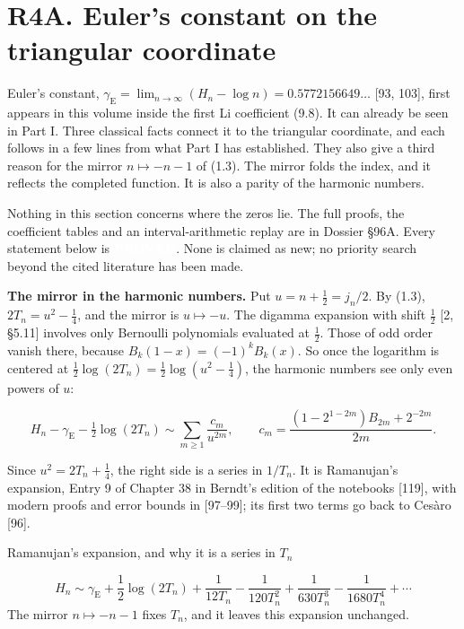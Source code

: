 \documentclass[
  11pt,
]{book}
\newcommand{\tnstatusbox}[2]{%
  {\setlength{\fboxsep}{2.1pt}%
   \colorbox{#1}{\textcolor{white}{\scriptsize\bfseries\hspace{0.5pt}#2\hspace{0.5pt}}}}}
\newcommand{\PROVED}{\tnstatusbox{tngreen}{PROVED}}
\begin{document}
\section{R4A. Euler's constant on the triangular
coordinate}\label{r4a.-eulers-constant-on-the-triangular-coordinate}

Euler's constant,
\(\gamma_{\mathrm E}=\lim_{n\to\infty}(H_n-\log n)=0.5772156649\ldots\)
{[}93, 103{]}, first appears in this volume inside the first Li
coefficient (9.8). It can already be seen in Part I. Three classical
facts connect it to the triangular coordinate, and each follows in a few
lines from what Part I has established. They also give a third reason
for the mirror \(n\mapsto-n-1\) of (1.3). The mirror folds the index,
and it reflects the completed function. It is also a parity of the
harmonic numbers.

Nothing in this section concerns where the zeros lie. The full proofs,
the coefficient tables and an interval-arithmetic replay are in Dossier
§96A. Every statement below is \PROVED{}. None is claimed as new; no
priority search beyond the cited literature has been made.

\textbf{The mirror in the harmonic numbers.} Put \(u=n+\tfrac12=j_n/2\).
By (1.3), \(2T_n=u^2-\tfrac14\), and the mirror is \(u\mapsto-u\). The
digamma expansion with shift \(\tfrac12\) {[}2, §5.11{]} involves only
Bernoulli polynomials evaluated at \(\tfrac12\). Those of odd order
vanish there, because \(B_k(1-x)=(-1)^kB_k(x)\). So once the logarithm
is centered at \(\tfrac12\log(2T_n)=\tfrac12\log(u^2-\tfrac14)\), the
harmonic numbers see only even powers of \(u\):

\[
H_n-\gamma_{\mathrm E}-\tfrac12\log(2T_n)\sim\sum_{m\ge1}\frac{c_m}{u^{2m}},
\qquad
c_m=\frac{(1-2^{1-2m})B_{2m}+2^{-2m}}{2m}.
\tag{GA.1}
\]

Since \(u^2=2T_n+\tfrac14\), the right side is a series in \(1/T_n\). It
is Ramanujan's expansion, Entry 9 of Chapter 38 in Berndt's edition of
the notebooks {[}119{]}, with modern proofs and error bounds in
{[}97--99{]}; its first two terms go back to Cesàro {[}96{]}.

\begin{tnclosed}{Ramanujan's expansion, and why it is a series in $T_n$}

\[
H_n\sim\gamma_{\mathrm E}+\frac12\log(2T_n)+\frac1{12T_n}-\frac1{120T_n^2}
+\frac1{630T_n^3}-\frac1{1680T_n^4}+\cdots
\tag{GA.2}
\] The mirror \(n\mapsto-n-1\) fixes \(T_n\), and it leaves this
expansion unchanged.

\end{tnclosed}
\end{document}
